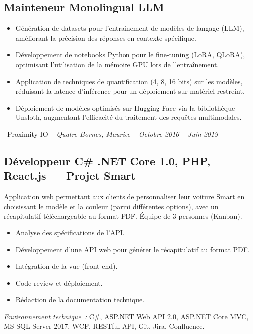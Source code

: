 \documentclass[10pt,a4paper]{article}
\begin{document}
\subsection*{Mainteneur Monolingual LLM}
\color{darkgray}
\begin{itemize}
  \item Génération de datasets pour l'entraînement de modèles de langage (LLM), améliorant la précision des réponses en contexte spécifique.
  \item Développement de notebooks Python pour le fine-tuning (LoRA, QLoRA), optimisant l'utilisation de la mémoire GPU lors de l'entraînement.
  \item Application de techniques de quantification (4, 8, 16 bits) sur les modèles, réduisant la latence d'inférence pour un déploiement sur matériel restreint.
  \item Déploiement de modèles optimisés sur Hugging Face via la bibliothèque Unsloth, augmentant l'efficacité du traitement des requêtes multimodales.
\end{itemize}

\vspace{10pt}

\noindent\textcolor{primary}{ \faBuilding\ Proximity IO} \quad
\textit{ \small \textcolor{darkgray}{ \faMapMarker\ } Quatre Bornes, Maurice } \hfill
\textit{ \small \textcolor{darkgray}{ \faCalendar\ } Octobre 2016 -- Juin 2019 }

\vspace{4pt}

\subsection*{Développeur C\# .NET Core 1.0, PHP, React.js --- Projet Smart}
\color{darkgray}
Application web permettant aux clients de personnaliser leur voiture Smart en choisissant le modèle et la couleur (parmi différentes options), avec un récapitulatif téléchargeable au format PDF. Équipe de 3 personnes (Kanban).
\begin{itemize}
  \item Analyse des spécifications de l'API.
  \item Développement d'une API web pour générer le récapitulatif au format PDF.
  \item Intégration de la vue (front-end).
  \item Code review et déploiement.
  \item Rédaction de la documentation technique.
\end{itemize}
\textit{Environnement technique~:} C\#, ASP.NET Web API 2.0, ASP.NET Core MVC, MS SQL Server 2017, WCF, RESTful API, Git, Jira, Confluence.
\end{document}
